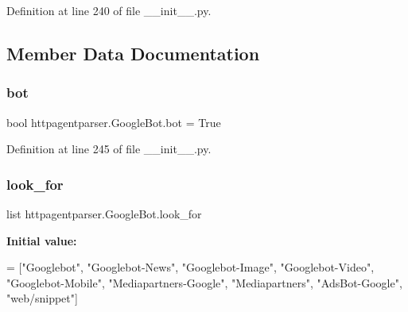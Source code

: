 Definition at line 240 of file \+\_\+\+\_\+init\+\_\+\+\_\+.\+py.



\subsection{Member Data Documentation}
\hypertarget{classhttpagentparser_1_1_google_bot_a2dd2130d9ff8a3ada4242343a8d9f46f}{}\label{classhttpagentparser_1_1_google_bot_a2dd2130d9ff8a3ada4242343a8d9f46f} 
\subsubsection{\texorpdfstring{bot}{bot}}
{\footnotesize\ttfamily bool httpagentparser.\+Google\+Bot.\+bot = True\hspace{0.3cm}{\ttfamily [static]}}



Definition at line 245 of file \+\_\+\+\_\+init\+\_\+\+\_\+.\+py.

\hypertarget{classhttpagentparser_1_1_google_bot_a636bf433b35b63c3e2ffad370cadbc25}{}\label{classhttpagentparser_1_1_google_bot_a636bf433b35b63c3e2ffad370cadbc25} 
\subsubsection{\texorpdfstring{look\+\_\+for}{look\_for}}
{\footnotesize\ttfamily list httpagentparser.\+Google\+Bot.\+look\+\_\+for\hspace{0.3cm}{\ttfamily [static]}}

{\bfseries Initial value\+:}
\begin{DoxyCode}
=  [\textcolor{stringliteral}{"Googlebot"}, \textcolor{stringliteral}{"Googlebot-News"}, \textcolor{stringliteral}{"Googlebot-Image"},
                \textcolor{stringliteral}{"Googlebot-Video"}, \textcolor{stringliteral}{"Googlebot-Mobile"}, \textcolor{stringliteral}{"Mediapartners-Google"},
                \textcolor{stringliteral}{"Mediapartners"}, \textcolor{stringliteral}{"AdsBot-Google"}, \textcolor{stringliteral}{"web/snippet"}]
\end{DoxyCode}


